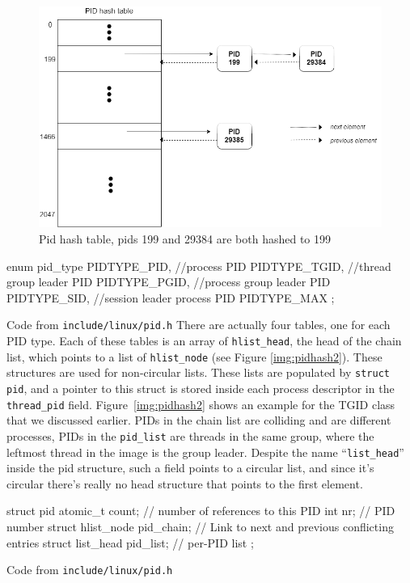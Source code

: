 \begin{figure}[ht]
\includegraphics[width=\textwidth]{images/pidhash1}
\caption{Pid hash table, pids 199 and 29384 are both hashed to 199}
\label{img:pidhash1}
\end{figure}

\begin{code}
enum pid_type {
	PIDTYPE_PID,  //process PID
	PIDTYPE_TGID, //thread group leader PID
	PIDTYPE_PGID, //process group leader PID
	PIDTYPE_SID,  //session leader process PID
	PIDTYPE_MAX
};
\end{code}
Code from \verb|include/linux/pid.h|\newline
There are actually four tables, one for each PID type. Each of these tables is an array of \verb|hlist_head|, the head of the chain list, which points to a list of \verb|hlist_node| (see Figure \ref{img:pidhash2}). These  structures are used for non-circular lists. These lists are populated by \verb|struct pid|, and a pointer to this struct is stored inside each process descriptor in the \verb|thread_pid| field. Figure~\ref{img:pidhash2} shows an example for the TGID class that we discussed earlier. PIDs in the chain list are colliding and are different processes, PIDs in the \verb|pid_list| are threads in the same group, where the leftmost thread in the image is the group leader. Despite the name ``\verb|list_head|'' inside the pid structure, such a field points to a circular list, and since it's circular there's really no head structure that points to the first element. %

\begin{code}
struct pid {
        atomic_t count; // number of references to this PID
	int nr; // PID number
	struct hlist_node pid_chain; // Link to next and previous conflicting entries
	struct list_head pid_list;  // per-PID list
};
\end{code}
Code from \verb|include/linux/pid.h|

